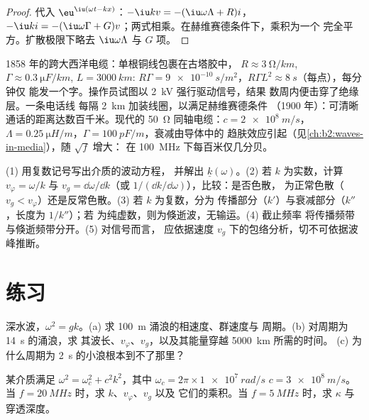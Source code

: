 \begin{proof}
代入 $\eu^{\iu(\omega t - kx)}$：$-\iu kv = -(\iu\omega\Lambda + R)i$，$-\iu ki = -(\iu
\omega\Gamma + G)v$；两式相乘。在赫维赛德条件下，乘积为一个
完全平方。扩散极限下略去 $\iu\omega\Lambda$ 与 $G$ 项。
\end{proof}

\begin{example}[三条电缆]\label{ex:b2:dispersion-wave-packets:cables}
1858 年的跨大西洋电缆：单根铜线包裹在古塔胶中，
$R \approx \qty{3}{\ohm/km}$, $\Gamma \approx \qty{0.3}{\micro F/km}$, $L = \qty{3000}{km}$:
$R\Gamma = \qty{9e-10}{s/m^2}$，$R\Gamma L^2 \approx \qty{8}{s}$（每点），每分钟仅
能发一个字。操作员试图以 \qty{2}{kV} 强行驱动信号，结果
数周内便击穿了绝缘层。一条电话线
每隔 \qty{2}{km} 加装线圈，以满足赫维赛德条件
（1900 年）：可清晰通话的距离达数百千米。现代的 \qty{50}{\ohm}
同轴电缆：$c = \qty{2e8}{m/s}$，$\Lambda = \qty{0.25}{\micro H/m}$，$\Gamma =
\qty{100}{pF/m}$，衰减由导体中的
趋肤效应引起（见\cref{ch:b2:waves-in-media}），随 $\sqrt f$ 增大：
在 \qty{100}{MHz} 下每百米仅几分贝。
\end{example}

\begin{method}[读懂色散关系]\label{met:b2:dispersion-wave-packets:method}
(1) 用复数记号写出介质的波动方程，
并解出 $\underline k(\omega)$。(2) 若 $k$ 为实数，计算 $v_\varphi = \omega/k$ 与
$v_g = \dd\omega/\dd k$（或 $1/(\dd k/\dd\omega)$），比较：是否色散，
为正常色散（$v_g < v_\varphi$）还是反常色散。(3) 若 $k$ 为复数，分为
传播部分（$k'$）与衰减部分（$k''$，长度为 $1/k''$）；若
为纯虚数，则为倏逝波，无输运。(4) 截止频率
将传播频带与倏逝频带分开。(5) 对信号而言，
应依据速度 $v_g$ 下的包络分析，切不可依据波峰推断。
\end{method}

\section{练习}

\begin{exercise}[$\star$]\label{exo:b2:dispersion-wave-packets:1}
深水波，$\omega^2 = gk$。(a) 求 \qty{100}{m} 涌浪的相速度、群速度与
周期。(b) 对周期为 \qty{14}{s} 的涌浪，求
其波长、$v_\varphi$、$v_g$，以及其能量穿越 \qty{5000}{km} 所需的时间。
(c) 为什么周期为 \qty{2}{s} 的小浪根本到不了那里？
\end{exercise}

\begin{exercise}[$\star$]\label{exo:b2:dispersion-wave-packets:2}
某介质满足 $\omega^2 = \omega_c^2 + c^2k^2$，其中 $\omega_c = 2\pi \times \qty{1e7}{rad/s}$
$c = \qty{3e8}{m/s}$。当 $f = \qty{20}{MHz}$ 时，求 $k$、$v_\varphi$、$v_g$ 以及
它们的乘积。当 $f = \qty{5}{MHz}$ 时，求 $\kappa$ 与穿透深度。
\end{exercise}

